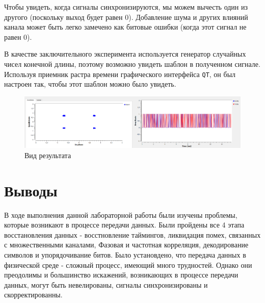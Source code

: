 \documentclass[a4paper]{article}
\begin{document}
            Чтобы увидеть, когда сигналы синхронизируются, мы можем вычесть один из другого (поскольку выход будет равен 0). Добавление шума и других влияний канала может быть легко замечено как битовые ошибки (когда этот сигнал не равен 0). 
            
            В качестве заключительного эксперимента используется генератор случайных чисел конечной длины, поэтому возможно увидеть шаблон в полученном сигнале. Используя приемник растра времени графического интерфейса \texttt{QT}, он был настроен так, чтобы этот шаблон можно было увидеть.
            
            \begin{figure}[H]
                \centering
                \includegraphics[width=\textwidth]{img/p8_2.png}
                \caption{Вид результата}
                \label{fig:p8_2}
            \end{figure}
            
    \newpage
        \section{Выводы}
            В ходе выполнения данной лабораторной работы были изучены проблемы, которые возникают в процессе передачи данных. Были пройдены все 4 этапа восстановления данных - восстновление таймингов, ликвидация помех, связанных с множественными каналами, Фазовая и частотная корреляция, декодирование символов и упорядочивание битов. Было установдено, что передача данных в физической среде - сложный процесс, имеющий много трудностей. Однако они преодолимы и большинство искажений, возникающих в процессе передачи данных, могут быть невелированы, сигналы синхронизированы и скорректированны.
            
\end{document}
